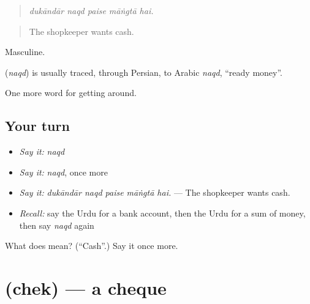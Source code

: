 \begin{quote}
    
\end{quote}

\begin{quote}
\emph{dukāndār naqd paise māṅgtā hai.}
\end{quote}

\begin{quote}
The shopkeeper wants cash.
\end{quote}

Masculine.

\begin{cousinweb}
\textbf{} (\emph{naqd}) is usually traced, through Persian, to Arabic \emph{naqd}, \textquotedblleft{}ready money\textquotedblright{}.
\end{cousinweb}

\begin{grammarlens}[title={What you've built}]
One more word for getting around.
\end{grammarlens}

\subsection*{Your turn}
\begin{itemize}
\raggedright
  \item \emph{Say it:} \emph{naqd}
  \item \emph{Say it:} \emph{naqd}, once more
  \item \emph{Say it:} \emph{dukāndār naqd paise māṅgtā hai.} — The shopkeeper wants cash.
  \item \emph{Recall:} say the Urdu for a bank account, then the Urdu for a sum of money, then say \emph{naqd} again
\end{itemize}

\begin{tcolorbox}[breakable,colback=teal!4,colframe=teal!35!black,title={Before you move on}]
What does  mean? (\textquotedblleft{}Cash\textquotedblright{}.) Say it once more.
\end{tcolorbox}
\section[\texorpdfstring{\ur{چیک} (chek)}{چیک (chek)}]{ (chek) — a cheque}

\label{lesson:UR-C417-chek}




